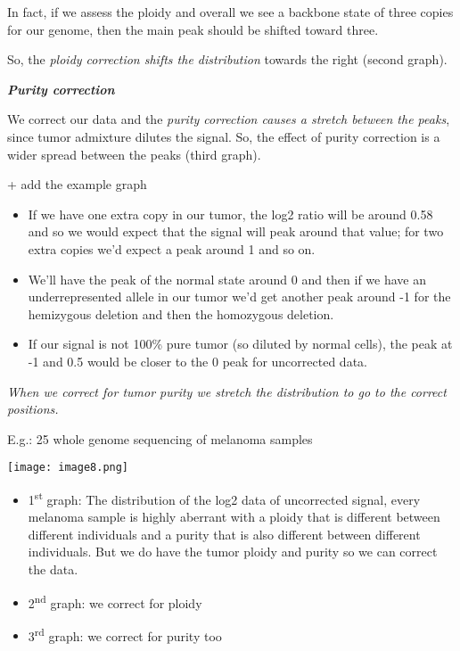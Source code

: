 In fact, if we assess the ploidy and overall we see a backbone state of three
copies for our genome, then the main peak should be shifted toward three.

So, the \emph{ploidy correction shifts the distribution} towards the right
(second graph).

\emph{\textbf{Purity correction}}

We correct our data and the \emph{{purity correction causes a stretch between
the peaks}}, since tumor admixture dilutes the signal. So, the effect of purity
correction is a wider spread between the peaks (third graph).

+ add the example graph

\begin{itemize}
\item
  If we have one extra copy in our tumor, the log2 ratio will be around 0.58 and
  so we would expect that the signal will peak around that value; for two extra
  copies we'd expect a peak around 1 and so on.
\item
  We'll have the peak of the normal state around 0 and then if we have an
  underrepresented allele in our tumor we'd get another peak around -1 for the
  hemizygous deletion and then the homozygous deletion.
\item
  If our signal is not 100\% pure tumor (so diluted by normal cells), the peak
  at -1 and 0.5 would be closer to the 0 peak for uncorrected data.
\end{itemize}

\emph{{When we correct for tumor purity we stretch the distribution to go to the
correct positions.}}

E.g.: 25 whole genome sequencing of melanoma samples

\texttt{[image: image8.png]}\\

\begin{itemize}
\item
  1\textsuperscript{st} graph: The distribution of the log2 data of uncorrected
  signal, every melanoma sample is highly aberrant with a ploidy that is
  different between different individuals and a purity that is also different
  between different individuals. But we do have the tumor ploidy and purity so
  we can correct the data.
\item
  2\textsuperscript{nd} graph: we correct for ploidy
\item
  3\textsuperscript{rd} graph: we correct for purity too
\end{itemize}

